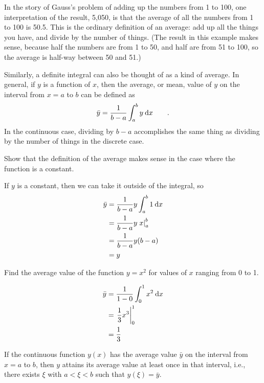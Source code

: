 In the story of Gauss's problem of adding up the numbers from 1 to 100, one interpretation of
the result, 5,050, is that the average of all the numbers from 1 to 100 is 50.5. This is the
ordinary definition of an average: add up all the things you have, and divide by the number
of things. (The result in this example makes sense, because half the numbers
are from 1 to 50, and half are from 51 to 100, so the average is half-way between 50 and 51.)

Similarly, a definite integral can also be thought of as a kind of average. In general, if $y$ is
a function of $x$, then the average, or mean, value of $y$ on the interval from $x=a$ to $b$ can be
defined as
\begin{equation*}
  \bar{y} = \frac{1}{b-a} \int_a^b y\:\textup{d} x \qquad .
\end{equation*}
In the continuous case, dividing by $b-a$ accomplishes the same thing as dividing by the
number of things in the discrete case.

\begin{eg}
\egquestion Show that the definition of the average makes sense in the case where the function
is a constant.

\eganswer If $y$ is a constant, then we can take it outside of the integral, so
\begin{align*}
  \bar{y} &= \frac{1}{b-a} y \int_a^b 1\:\textup{d} x \\
                     &= \frac{1}{b-a} y \left.x\right|_a^b \\
                     &= \frac{1}{b-a} y (b-a) \\
                     &= y
\end{align*}
\end{eg}

\begin{eg}\label{eg:mean-of-square}
\egquestion Find the average value of the function $y=x^2$ for values of $x$ ranging from
0 to 1.

\begin{align*}
  \bar{y} &= \frac{1}{1-0} \int_0^1 x^2\:\textup{d} x \\
                     &= \left.\frac{1}{3}x^3\right|_0^1 \\
                     &= \frac{1}{3}
\end{align*}
\end{eg}

\begin{important}
If the continuous function $y(x)$ has the average value $\bar{y}$ on the interval
from $x=a$ to $b$, then $y$ attains its average value at least once in that interval,
i.e., there exists $\xi$ with $a<\xi<b$ such that $y(\xi)=\bar{y}$.
\end{important}


